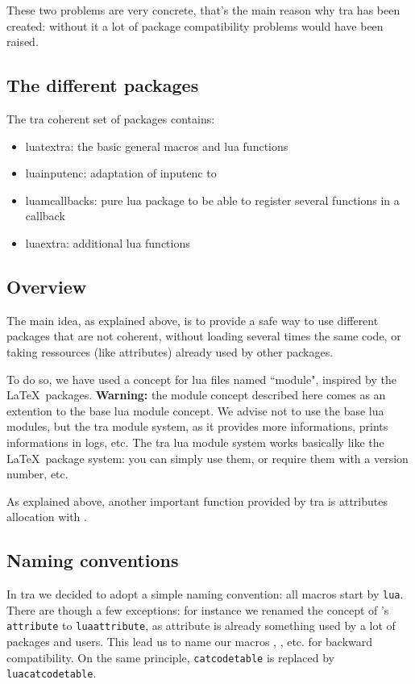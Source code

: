 \documentclass{article}
\begin{document}
These two problems are very concrete, that's the main reason why \LuaTeX tra has been created: without it a lot of package compatibility problems would have been raised.

\subsection{The different packages}

The \LuaTeX tra coherent set of packages contains:

\begin{itemize}
\item \textsf{luatextra}: the basic general macros and lua functions
\item \textsf{luainputenc}: adaptation of \textsf{inputenc} to \LuaTeX
\item \textsf{luamcallbacks}: pure lua package to be able to register several functions in a callback
\item \textsf{luaextra}: additional lua functions
\end{itemize}

\subsection{Overview}

The main idea, as explained above, is to provide a safe way to use different packages that are not coherent, without loading several times the same code, or taking ressources (like attributes) already used by other packages.

To do so, we have used a concept for lua files named ``module", inspired by the \LaTeX\ packages. \textbf{Warning:} the module concept described here comes as an extention to the base lua module concept. We advise not to use the base lua modules, but the \LuaTeX tra module system, as it provides more informations, prints informations in logs, etc. The \LuaTeX tra lua module system works basically like the \LaTeX\ package system: you can simply use them, or require them with a version number, etc.

As explained above, another important function provided by \LuaTeX tra is attributes allocation with \texttt{\string\newluaattribute}.

\subsection{Naming conventions}

In \LuaTeX tra we decided to adopt a simple naming convention: all macros start by \texttt{lua}. There are though a few exceptions: for instance we renamed the concept of \LuaTeX 's \texttt{attribute} to \texttt{luaattribute}, as attribute is already something used by a lot of packages and users. This lead us to name our macros \texttt{\string\newluaattribute}, \texttt{\string\unsetluaattribute}, etc. for backward compatibility. On the same principle, \texttt{catcodetable} is replaced by \texttt{luacatcodetable}.
\end{document}
